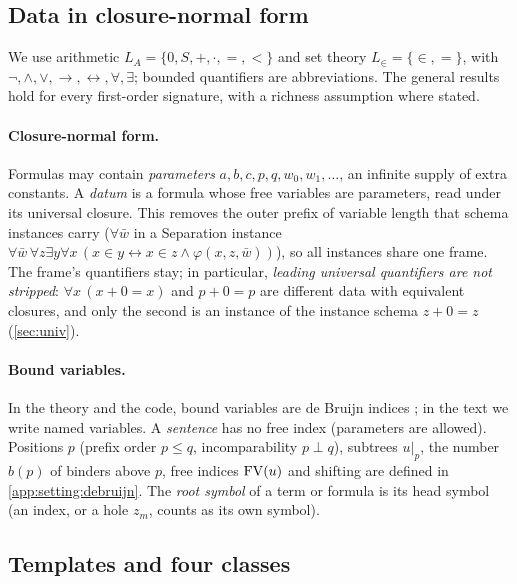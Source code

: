 \subsection{Data in closure-normal form}\label{sec:setting:syntax}

We use arithmetic $L_A=\{0,S,+,\cdot,=,<\}$ and set theory $L_\in=\{\in,=\}$, with $\neg,\wedge,\vee,\to,\leftrightarrow,\forall,\exists$; bounded quantifiers are abbreviations. The general results hold for every first-order signature, with a richness assumption where stated.

\paragraph{Closure-normal form.}
Formulas may contain \emph{parameters} $a,b,c,p,q,w_0,w_1,\dots$, an infinite supply of extra constants. A \emph{datum} is a formula whose free variables are parameters, read under its universal closure. This removes the outer prefix of variable length that schema instances carry ($\forall\bar w$ in a Separation instance $\forall\bar w\,\forall z\exists y\forall x\,(x\in y\leftrightarrow x\in z\wedge\varphi(x,z,\bar w))$), so all instances share one frame. The frame's quantifiers stay; in particular, \emph{leading universal quantifiers are not stripped}: $\forall x\,(x+0=x)$ and $p+0=p$ are different data with equivalent closures, and only the second is an instance of the instance schema $z+0=z$ (\cref{sec:univ}).

\paragraph{Bound variables.}
In the theory and the code, bound variables are de Bruijn indices \citep{debruijn1972lambda}; in the text we write named variables. A \emph{sentence} has no free index (parameters are allowed). Positions $p$ (prefix order $p\le q$, incomparability $p\perp q$), subtrees $u|_p$, the number $b(p)$ of binders above $p$, free indices $\mathrm{FV}(u)$ and shifting are defined in \cref{app:setting:debruijn}. The \emph{root symbol} of a term or formula is its head symbol (an index, or a hole $z_m$, counts as its own symbol).

\subsection{Templates and four classes}\label{sec:setting:templates}

